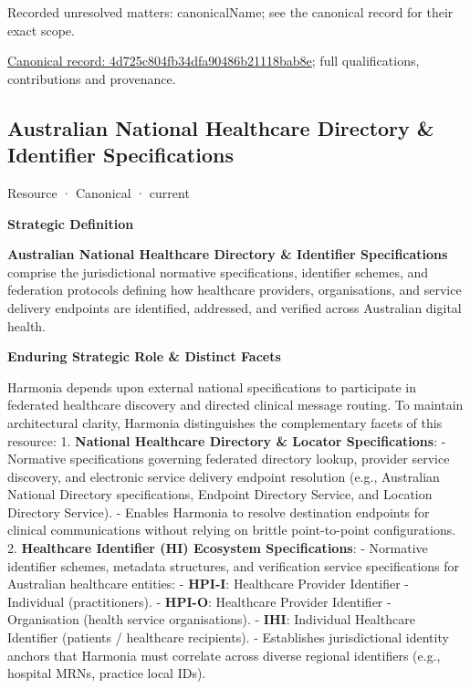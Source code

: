 {\small Recorded unresolved matters: canonicalName; see the canonical record for their exact scope.}\par
{\footnotesize \href{../../../../continuum/strategy/resource/4d725c804fb34dfa90486b21118bab8e.md}{Canonical record: 4d725c804fb34dfa90486b21118bab8e}; full qualifications, contributions and provenance.}\par
\subsection{Australian National Healthcare Directory \& Identifier Specifications}

\label{element:eac71c56624d43bda2b9d3648f14603a}
{\small Resource · Canonical · current}\par

\par\medskip\textbf{Strategic Definition}\par


\textbf{Australian National Healthcare Directory \& Identifier Specifications} comprise the jurisdictional normative specifications, identifier schemes, and federation protocols defining how healthcare providers, organisations, and service delivery endpoints are identified, addressed, and verified across Australian digital health.



\par\medskip\textbf{Enduring Strategic Role \& Distinct Facets}\par


Harmonia depends upon external national specifications to participate in federated healthcare discovery and directed clinical message routing. To maintain architectural clarity, Harmonia distinguishes the complementary facets of this resource:
1. \textbf{National Healthcare Directory \& Locator Specifications}:
   - Normative specifications governing federated directory lookup, provider service discovery, and electronic service delivery endpoint resolution (e.g., Australian National Directory specifications, Endpoint Directory Service, and Location Directory Service).
   - Enables Harmonia to resolve destination endpoints for clinical communications without relying on brittle point-to-point configurations.
2. \textbf{Healthcare Identifier (HI) Ecosystem Specifications}:
   - Normative identifier schemes, metadata structures, and verification service specifications for Australian healthcare entities:
     - \textbf{HPI-I}: Healthcare Provider Identifier - Individual (practitioners).
     - \textbf{HPI-O}: Healthcare Provider Identifier - Organisation (health service organisations).
     - \textbf{IHI}: Individual Healthcare Identifier (patients / healthcare recipients).
   - Establishes jurisdictional identity anchors that Harmonia must correlate across diverse regional identifiers (e.g., hospital MRNs, practice local IDs).



